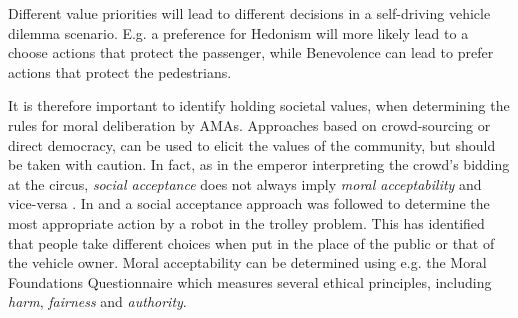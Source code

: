 \documentclass[twocolumn]{article}
\begin{document}

Different value priorities will lead to different decisions in a self-driving vehicle dilemma scenario. E.g. a preference for Hedonism will more likely lead to a choose actions that protect the passenger, while Benevolence can lead to prefer actions that protect the pedestrians. 

It is therefore important to identify holding societal values, when determining the rules for moral deliberation by AMAs. Approaches based on crowd-sourcing or direct democracy, can be used to elicit the values of the community, but should be taken with caution. In fact, as in the emperor interpreting the crowd's bidding at the circus, \textit{social acceptance} does not always imply \textit{moral acceptability} and vice-versa \cite{verdiesen2016mood}. In \cite{malle2015sacrifice} and \cite{Bonnefon1573} a social acceptance approach was followed to determine the most appropriate action by a robot in the trolley problem. This has identified that people take different choices when put in the place of the public or that of the vehicle owner. Moral acceptability can be determined using e.g. the Moral Foundations Questionnaire \cite{graham2011mapping} which measures several ethical principles, including \textit{harm}, \textit{fairness} and \textit{authority}.
\end{document}

